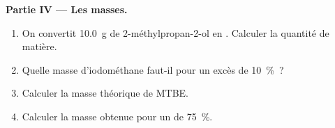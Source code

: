\begin{problem}
\medskip
\noindent\textbf{Partie IV --- Les masses.}
\begin{enumerate}[resume]
  \item On convertit \qty{10.0}{g} de 2-méthylpropan-2-ol en .
        Calculer la quantité de matière.
  \item Quelle masse d'iodométhane faut-il pour un excès de
        \qty{10}{\percent}~?
  \item Calculer la masse théorique de MTBE.
  \item Calculer la masse obtenue pour un  de \qty{75}{\percent}.
\end{enumerate}
\end{problem}
